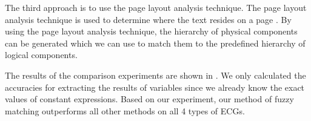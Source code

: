 The third approach is to use the page layout analysis technique. 
The page layout analysis technique is used to determine where the text 
resides on a page \cite{o1993document}\cite{kanungo2003stochastic} \cite{bartoli2014semisupervised}\cite{cai2003vips}. 
By using the page layout analysis technique, the hierarchy of physical components 
can be generated which we can use to match them to the predefined 
hierarchy of logical components. 


The results of the comparison experiments are shown in . 
We only calculated the accuracies for extracting the results of 
variables since we already know the exact values of constant 
expressions. Based on our experiment, our method of fuzzy matching 
outperforms all other methods on all 4 types of ECGs. 

